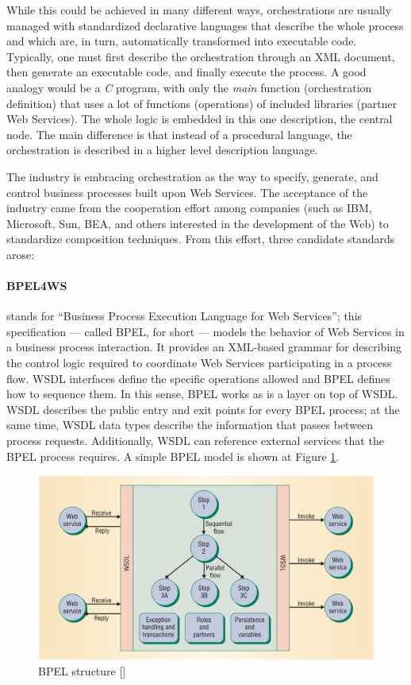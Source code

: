 While this could be achieved in many different ways, orchestrations are usually managed with standardized declarative languages that describe the whole process and which are, in turn, automatically transformed into executable code. Typically, one must first describe the orchestration through an XML document, then generate an executable code, and finally execute the process. A good analogy would be a \emph{C} program, with only the \emph{main} function (orchestration definition) that uses a lot of functions (operations) of included libraries (partner Web Services). The whole logic is embedded in this one description, the central node. The main difference is that instead of a procedural language, the orchestration is described in a higher level description language.

The industry is embracing orchestration as the way to specify, generate, and control business processes built upon Web Services. The acceptance of the industry came from the cooperation effort among companies (such as IBM, Microsoft, Sun, BEA, and others interested in the development of the Web) to standardize composition techniques. From this effort, three candidate standards arose:

\paragraph{BPEL4WS} 
stands for ``Business Process Execution Language for Web Services''; this specification — called BPEL, for short — models the behavior of Web Services in a business process interaction. It provides an XML-based grammar for describing the control logic required to coordinate Web Services participating in a process flow. WSDL interfaces define the specific operations allowed and BPEL defines how to sequence them. In this sense, BPEL works as is a layer on top of WSDL. WSDL describes the public entry and exit points for every BPEL process; at the same time, WSDL data types describe the information that passes between process requests. Additionally, WSDL can reference external services that the BPEL process requires. A simple BPEL model is shown at Figure \ref{BPELstructure}.

\begin{figure}[h]
  \centering
  \includegraphics[width=\textwidth]{images/BPELstructure}
  \caption{BPEL structure [\citet{WSOC}]}
  \label{BPELstructure}
\end{figure}

